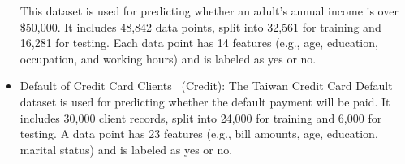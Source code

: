 \begin{itemize}[nosep,nolistsep]
 This dataset is used for predicting whether an adult's annual income is over \$50,000. It includes 48,842 data points, split into 32,561 for training and 16,281 for testing. Each data point has 14 features (e.g., age, education, occupation, and working hours) and is labeled as yes or no. %
    \item Default of Credit Card Clients~\cite{ref_47} (Credit): %
The Taiwan Credit Card Default dataset is used for predicting whether the default payment will be paid. It 
 includes 30,000 client records, split into 24,000 for training and 6,000 for testing.
 A data point has 23 features (e.g., bill amounts, age, education, marital status) and is labeled as yes or no.
  \end{itemize} 
 
